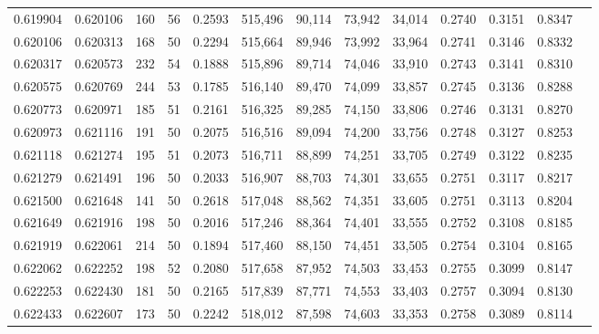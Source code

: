 \begin{tabular}{rrrrrrrrrrrrr}
0.619904 & 0.620106 &   160 &  56 &                                     0.2593 & 515,496 &  90,114 &  73,942 &  34,014 & 0.2740 & 0.3151 & 0.8347 \\
0.620106 & 0.620313 &   168 &  50 &                                     0.2294 & 515,664 &  89,946 &  73,992 &  33,964 & 0.2741 & 0.3146 & 0.8332 \\
0.620317 & 0.620573 &   232 &  54 &                                     0.1888 & 515,896 &  89,714 &  74,046 &  33,910 & 0.2743 & 0.3141 & 0.8310 \\
0.620575 & 0.620769 &   244 &  53 &                                     0.1785 & 516,140 &  89,470 &  74,099 &  33,857 & 0.2745 & 0.3136 & 0.8288 \\
0.620773 & 0.620971 &   185 &  51 &                                     0.2161 & 516,325 &  89,285 &  74,150 &  33,806 & 0.2746 & 0.3131 & 0.8270 \\
0.620973 & 0.621116 &   191 &  50 &                                     0.2075 & 516,516 &  89,094 &  74,200 &  33,756 & 0.2748 & 0.3127 & 0.8253 \\
0.621118 & 0.621274 &   195 &  51 &                                     0.2073 & 516,711 &  88,899 &  74,251 &  33,705 & 0.2749 & 0.3122 & 0.8235 \\
0.621279 & 0.621491 &   196 &  50 &                                     0.2033 & 516,907 &  88,703 &  74,301 &  33,655 & 0.2751 & 0.3117 & 0.8217 \\
0.621500 & 0.621648 &   141 &  50 &                                     0.2618 & 517,048 &  88,562 &  74,351 &  33,605 & 0.2751 & 0.3113 & 0.8204 \\
0.621649 & 0.621916 &   198 &  50 &                                     0.2016 & 517,246 &  88,364 &  74,401 &  33,555 & 0.2752 & 0.3108 & 0.8185 \\
0.621919 & 0.622061 &   214 &  50 &                                     0.1894 & 517,460 &  88,150 &  74,451 &  33,505 & 0.2754 & 0.3104 & 0.8165 \\
0.622062 & 0.622252 &   198 &  52 &                                     0.2080 & 517,658 &  87,952 &  74,503 &  33,453 & 0.2755 & 0.3099 & 0.8147 \\
0.622253 & 0.622430 &   181 &  50 &                                     0.2165 & 517,839 &  87,771 &  74,553 &  33,403 & 0.2757 & 0.3094 & 0.8130 \\
0.622433 & 0.622607 &   173 &  50 &                                     0.2242 & 518,012 &  87,598 &  74,603 &  33,353 & 0.2758 & 0.3089 & 0.8114 \\

\end{tabular}
